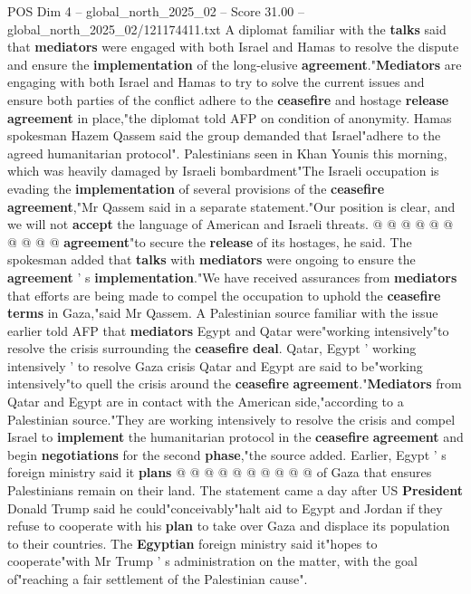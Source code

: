 \begin{textsample}{POS Dim 4 – global\_north\_2025\_02 – Score 31.00 – global\_north\_2025\_02/121174411.txt}
A diplomat familiar with the \textbf{talks} said that \textbf{mediators} were engaged with both Israel and Hamas to resolve the dispute and ensure the \textbf{implementation} of the long-elusive \textbf{agreement}."\textbf{Mediators} are engaging with both Israel and Hamas to try to solve the current issues and ensure both parties of the conflict adhere to the \textbf{ceasefire} and hostage \textbf{release} \textbf{agreement} in place,"the diplomat told AFP on condition of anonymity.
Hamas spokesman Hazem Qassem said the group demanded that Israel"adhere to the agreed humanitarian protocol".
Palestinians seen in Khan Younis this morning, which was heavily damaged by Israeli bombardment"The Israeli occupation is evading the \textbf{implementation} of several provisions of the \textbf{ceasefire} \textbf{agreement},"Mr Qassem said in a separate statement."Our position is clear, and we will not \textbf{accept} the language of American and Israeli threats. @ @ @ @ @ @ @ @ @ @ \textbf{agreement}"to secure the \textbf{release} of its hostages, he said.
The spokesman added that \textbf{talks} with \textbf{mediators} were ongoing to ensure the \textbf{agreement} ' s \textbf{implementation}."We have received assurances from \textbf{mediators} that efforts are being made to compel the occupation to uphold the \textbf{ceasefire} \textbf{terms} in Gaza,"said Mr Qassem.
A Palestinian source familiar with the issue earlier told AFP that \textbf{mediators} Egypt and Qatar were"working intensively"to resolve the crisis surrounding the \textbf{ceasefire} \textbf{deal}.
Qatar, Egypt ' working intensively ' to resolve Gaza crisis Qatar and Egypt are said to be"working intensively"to quell the crisis around the \textbf{ceasefire} \textbf{agreement}."\textbf{Mediators} from Qatar and Egypt are in contact with the American side,"according to a Palestinian source."They are working intensively to resolve the crisis and compel Israel to \textbf{implement} the humanitarian protocol in the \textbf{ceasefire} \textbf{agreement} and begin \textbf{negotiations} for the second \textbf{phase},"the source added.
Earlier, Egypt ' s foreign ministry said it \textbf{plans} @ @ @ @ @ @ @ @ @ @ of Gaza that ensures Palestinians remain on their land.
The statement came a day after US \textbf{President} Donald Trump said he could"conceivably"halt aid to Egypt and Jordan if they refuse to cooperate with his \textbf{plan} to take over Gaza and displace its population to their countries.
The \textbf{Egyptian} foreign ministry said it"hopes to cooperate"with Mr Trump ' s administration on the matter, with the goal of"reaching a fair settlement of the Palestinian cause".

\end{textsample}
